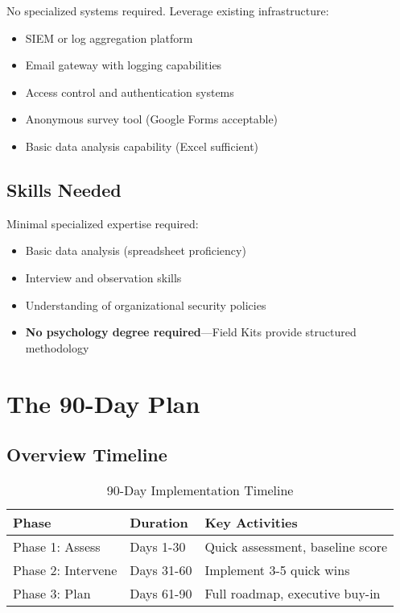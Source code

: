 \documentclass[11pt,a4paper]{article}
\begin{document}
No specialized systems required. Leverage existing infrastructure:
\begin{itemize}
\item SIEM or log aggregation platform
\item Email gateway with logging capabilities
\item Access control and authentication systems
\item Anonymous survey tool (Google Forms acceptable)
\item Basic data analysis capability (Excel sufficient)
\end{itemize}

\subsection{Skills Needed}

Minimal specialized expertise required:
\begin{itemize}
\item Basic data analysis (spreadsheet proficiency)
\item Interview and observation skills
\item Understanding of organizational security policies
\item \textbf{No psychology degree required}---Field Kits provide structured methodology
\end{itemize}

\section{The 90-Day Plan}

\subsection{Overview Timeline}

\begin{table}[h]
\centering
\caption{90-Day Implementation Timeline}
\begin{tabular}{lll}
\toprule
\textbf{Phase} & \textbf{Duration} & \textbf{Key Activities} \\
\midrule
Phase 1: Assess & Days 1-30 & Quick assessment, baseline score \\
Phase 2: Intervene & Days 31-60 & Implement 3-5 quick wins \\
Phase 3: Plan & Days 61-90 & Full roadmap, executive buy-in \\
\bottomrule
\end{tabular}
\end{table}
\end{document}
